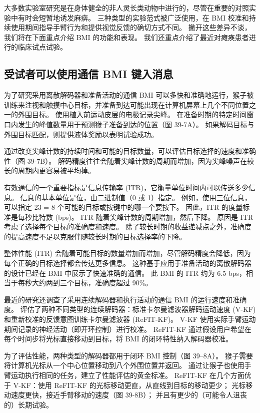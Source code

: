 大多数实验室研究是在身体健全的非人灵长类动物中进行的，尽管在重要的对照实验中有时会短暂地诱发麻痹。 三种类型的实验范式被广泛使用，在 BMI 校准和持续使用期间指导手臂行为和提供视觉反馈的确切方式不同。 撇开这些差异不谈，我们将在下面重点介绍 BMI 的功能和表现。 我们还重点介绍了最近对瘫痪患者进行的临床试点试验。

\subsection{受试者可以使用通信 BMI 键入消息}
为了研究采用离散解码器和准备活动的通信 BMI 可以多快和准确地运行，猴子被训练来注视和触摸中心目标，并准备到达可能出现在计算机屏幕上几个不同位置之一的外围目标。 使用植入前运动皮层的电极记录尖峰。 在准备时期的特定时间窗口内发生的峰值数量用于预测猴子准备到达的位置（图 39-7A）。 如果解码目标与外围目标匹配，则提供液体奖励以表明试验成功。

通过改变尖峰计数的持续时间和可能的目标数量，可以评估目标选择的速度和准确性（图 39-7B）。 解码精度往往会随着尖峰计数的周期而增加，因为尖峰噪声在较长的周期内更容易被平均掉。

有效通信的一个重要指标是信息传输率 (ITR)，它衡量单位时间内可以传送多少信息。 信息的基本单位是位，由二进制值（0 或 1）指定。 例如，使用三位信息，可以指定 23 = 8 个可能的目标或按键中的哪一个要按下。 因此，ITR 的度量标准是每秒比特数 (bps)。 ITR 随着尖峰计数的周期增加，然后下降。 原因是 ITR 考虑了选择每个目标的准确度和速度。 除了较长时期的收益递减点之外，准确度的提高速度不足以克服伴随较长时期的目标选择率的下降。

整体性能 (ITR) 会随着可能目标的数量增加而增加，尽管解码精度会降低，因为每个正确的目标选择都会传达更多信息。 这种基于应用于准备活动的离散解码器的设计已经在 BMI 中展示了快速准确的通信。 此 BMI 的 ITR 约为 6.5 bps，相当于每秒大约两到三个目标，准确度超过 90\%。

最近的研究还调查了采用连续解码器和执行活动的通信 BMI 的运行速度和准确度。 评估了两种不同类型的连续解码器：标准卡尔曼滤波器解码运动速度 (V-KF) 和重新校准的反馈意图训练卡尔曼滤波器 (ReFIT-KF)。 V-KF 使用实际手臂运动期间记录的神经活动（即开环控制）进行校准。 ReFIT-KF 通过假设用户希望在每个时间步将光标直接移动到目标，将 BMI 的闭环特性纳入解码器校准。

为了评估性能，两种类型的解码器都用于闭环 BMI 控制（图 39–8A）。 猴子需要将计算机光标从一个中心位置移动到八个外围位置并返回。 通过让猴子也使用手臂运动执行相同的任务，建立了性能评估的黄金标准。 ReFIT-KF 在几个方面优于 V-KF：使用 ReFIT-KF 的光标移动更直，从直线到目标的移动更少； 光标移动速度更快，接近手臂移动的速度（图 39-8B）； 并且有更少的（可能令人沮丧的）长期试验。

